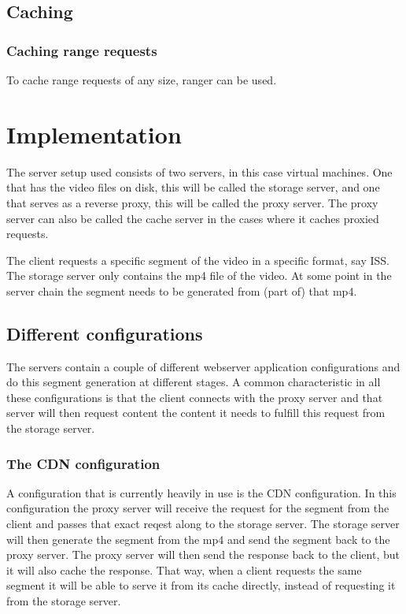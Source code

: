 \documentclass[twoside,openright]{uva-bachelor-thesis}
\begin{document}
\section{Caching}

\subsection{Caching range requests}
To cache range requests of any size, ranger \autocite{ranger} can be used.






\chapter{Implementation}
The server setup used consists of two servers, in this case virtual machines.
One that has the video files on disk, this will be called the storage server,
and one that serves as a reverse proxy, this will be called the proxy server.
The proxy server can also be called the cache server in the cases where it
caches proxied requests.

The client requests a specific segment of the video in a specific format, say
ISS. The storage server only contains the mp4 file of the video. At some point
in the server chain the segment needs to be generated from (part of) that mp4.

\section{Different configurations}
The servers contain a couple of different webserver application configurations and
do this segment generation at different stages. A common characteristic in all
these configurations is that the client connects with the proxy server and that
server will then request content the content it needs to fulfill this request
from the storage server.


\subsection{The CDN configuration}
A configuration that is currently heavily in use is the CDN configuration. In
this configuration the proxy server will receive the request for the segment
from the client and passes that exact reqest along to the storage server. The
storage server will then generate the segment from the mp4 and send the segment
back to the proxy server.  The proxy server will then send the response back to
the client, but it will also cache the response. That way, when a client
requests the same segment it will be able to serve it from its cache directly,
instead of requesting it from the storage server.
\end{document}
